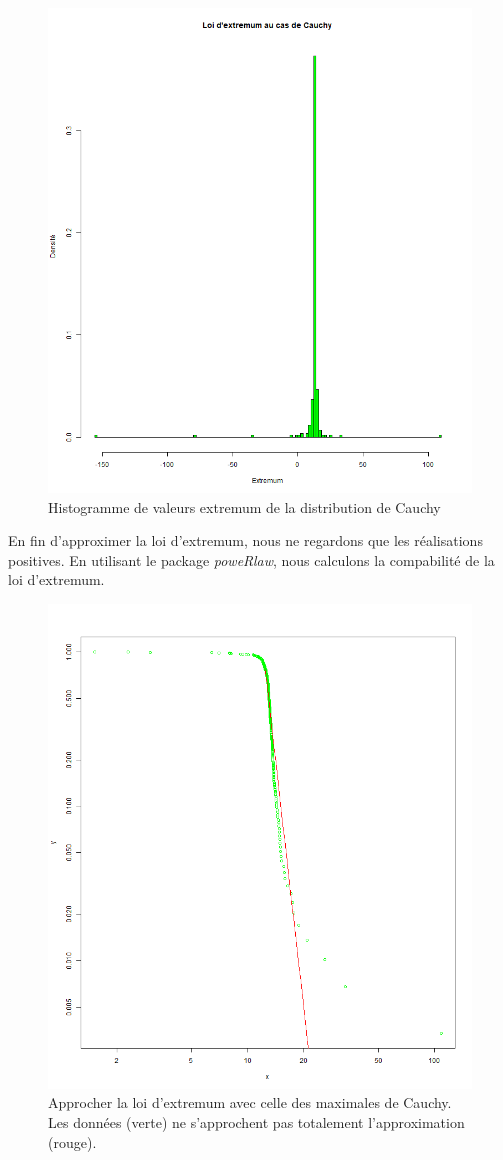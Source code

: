 \documentclass[12pt,a4paper,titlepage]{article}
\numberwithin{equation}{section}
\begin{document}
\begin{figure}[h]
\centering
\includegraphics[width=0.8\linewidth]{images/Cauchy_extremum.png}
\caption{Histogramme de valeurs extremum de la distribution de Cauchy}
\end{figure}

En fin d'approximer la loi d'extremum, nous ne regardons que les réalisations positives. En utilisant le package \emph{poweRlaw}, nous calculons la compabilité de la loi d'extremum.



\begin{figure}[h]
\centering
\includegraphics[width=0.8\linewidth]{images/Cauchy_extremum_fitting.png}
\caption{Approcher la loi d'extremum avec celle des maximales de Cauchy. Les données (verte) ne s'approchent pas totalement l'approximation (rouge).}
\end{figure}
\end{document}
